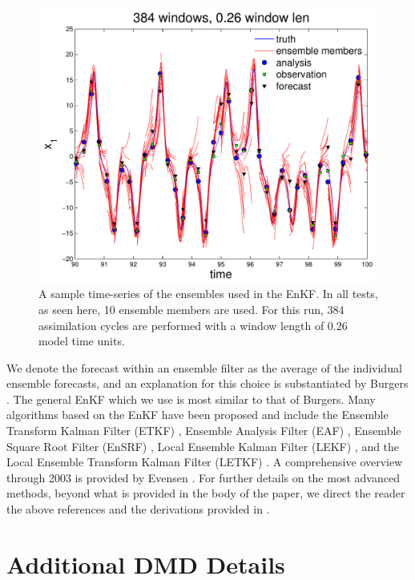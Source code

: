 \begin{figure}[h!]
  \centering
  \includegraphics[width=0.99\textwidth]{figures/EnKF_spaghetti.pdf}
  \caption[A sample time-series of the ensembles used in the EnKF]{
    A sample time-series of the ensembles used in the EnKF.
    In all tests, as seen here, 10 ensemble members are used.
    For this run, 384 assimilation cycles are performed with a window length of 0.26 model time units.
  }
  \label{fig:spaghetti}
\end{figure}

We denote the forecast within an ensemble filter as the average of the individual ensemble forecasts, and an explanation for this choice is substantiated by Burgers \cite{burgers1998analysis}.
The general EnKF which we use is most similar to that of Burgers.
Many algorithms based on the EnKF have been proposed and include the Ensemble Transform Kalman Filter (ETKF) \cite{ott2004local}, Ensemble Analysis Filter (EAF) \cite{anderson2001new}, Ensemble Square Root Filter (EnSRF) \cite{tippett2003ensemble}, Local Ensemble Kalman Filter (LEKF) \cite{ott2004local}, and the Local Ensemble Transform Kalman Filter (LETKF) \cite{hunt2007efficient}.
A comprehensive overview through 2003 is provided by Evensen \cite{evensen2003ensemble}.
For further details on the most advanced methods, beyond what is provided in the body of the paper, we direct the reader the above references and the derivations provided in \cite{reagan2013}.

\clearpage
\pagebreak
\section{Additional DMD Details}

